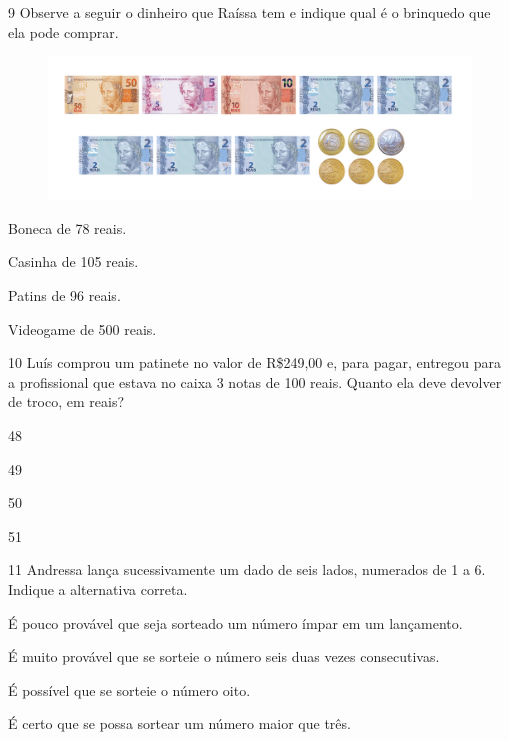 \num{9} Observe a seguir o dinheiro que Raíssa tem e indique qual é o brinquedo que ela pode comprar.

\begin{figure}[H]
\includegraphics[width=\textwidth]{./media/image156.png}
\end{figure}

\begin{escolha}[itemsep=-5pt]
\item Boneca de 78 reais.

\item Casinha de 105 reais.

\item Patins de 96 reais.

\item Videogame de 500 reais.
\end{escolha}

\num{10} Luís comprou um patinete no valor de R\$249,00 e, para pagar, entregou
para a profissional que estava no caixa 3 notas de 100 reais. Quanto ela deve devolver de troco, em reais?

\begin{escolha}[itemsep=-5pt]
\item 48

\item 49

\item 50

\item 51
\end{escolha}

\num{11} Andressa lança sucessivamente um dado de seis lados, numerados de 1 a 6.
Indique a alternativa correta.

\begin{escolha}[itemsep=-5pt]
\item É pouco provável que seja sorteado um número ímpar em um lançamento.

\item É muito provável que se sorteie o número seis duas vezes consecutivas.

\item É possível que se sorteie o número oito.

\item É certo que se possa sortear um número maior que três.
\end{escolha}


